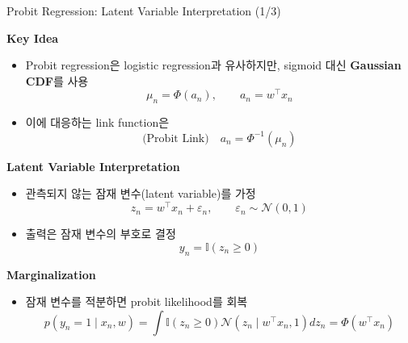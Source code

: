 \documentclass[xcolor=dvipsnames,t,9pt]{beamer}
\begin{document}
\begin{frame}{Probit Regression: Latent Variable Interpretation (1/3)}

    \textbf{Key Idea}
    \begin{itemize}
        \item Probit regression은 logistic regression과 유사하지만, sigmoid 대신 \textbf{Gaussian CDF}를 사용
        \[
        \mu_n = \Phi(a_n), \qquad a_n = w^\top x_n
        \]
        \item 이에 대응하는 link function은
        \[
            \text{(Probit Link)} \quad a_n = \Phi^{-1}(\mu_n)
        \]
    \end{itemize}
    
    \medskip
    \textbf{Latent Variable Interpretation}
    \begin{itemize}
        \item 관측되지 않는 잠재 변수(latent variable)를 가정
        \[
        z_n = w^\top x_n + \varepsilon_n, 
        \qquad \varepsilon_n \sim \mathcal{N}(0,1)
        \]
        \item 출력은 잠재 변수의 부호로 결정
        \[
        y_n = \mathbb{I}(z_n \ge 0)
        \]
    \end{itemize}
    
    \medskip
    \textbf{Marginalization}
    \begin{itemize}
        \item 잠재 변수를 적분하면 probit likelihood를 회복
        \[
        p(y_n=1 \mid x_n, w)
        = \int \mathbb{I}(z_n \ge 0)\mathcal{N}(z_n\mid w^\top x_n, 1)dz_n
        = \Phi(w^\top x_n)
        \]
    \end{itemize}
    
\end{frame}

\end{document}
